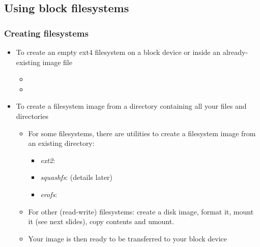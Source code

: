 \subsection{Using block filesystems}

\begin{frame}
  \frametitle{Creating filesystems}
  \begin{itemize}
  \item To create an empty ext4 filesystem on a block device or
    inside an already-existing image file
    \begin{itemize}
    \item {}
    \item {}
    \end{itemize}
  \item To create a filesystem image from a directory containing all
    your files and directories
    \begin{itemize}
    \item For some filesystems, there are utilities to create a
          filesystem image from an existing directory:
          \begin{itemize}
          \item {\em ext2}: 
	      \item {\em squashfs}:  (details later)
          \item {\em erofs}: 
          \end{itemize}
    \item For other (read-write) filesystems: create a disk image,
          format it, mount it (see next slides), copy contents and umount.
    \item Your image is then ready to be transferred to your block device
    \end{itemize}
  \end{itemize}
\end{frame}


